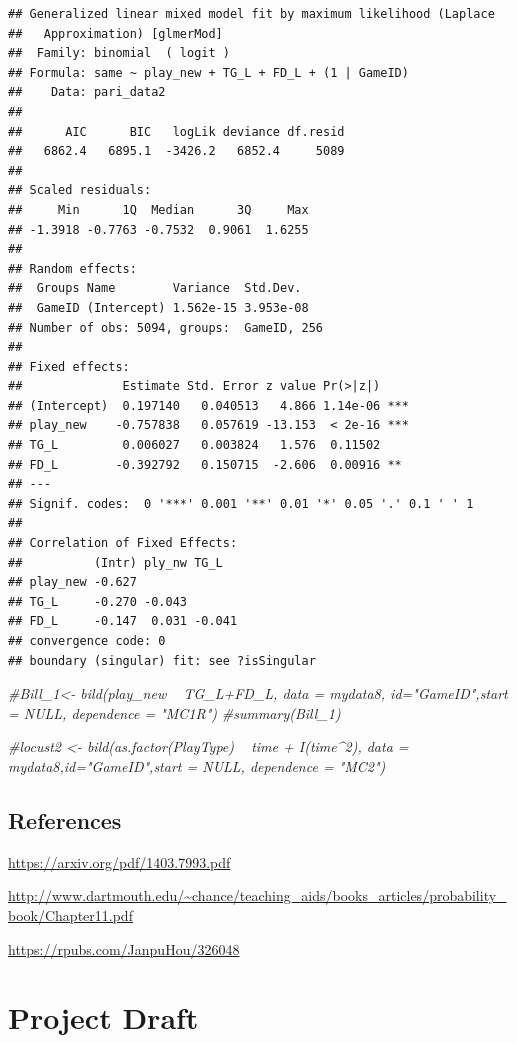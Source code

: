 \documentclass[]{book}
\newenvironment{Shaded}{\begin{snugshade}}{\end{snugshade}}
\newcommand{\CommentTok}[1]{\textcolor[rgb]{0.56,0.35,0.01}{\textit{#1}}}
\begin{document}
\begin{verbatim}
## Generalized linear mixed model fit by maximum likelihood (Laplace
##   Approximation) [glmerMod]
##  Family: binomial  ( logit )
## Formula: same ~ play_new + TG_L + FD_L + (1 | GameID)
##    Data: pari_data2
## 
##      AIC      BIC   logLik deviance df.resid 
##   6862.4   6895.1  -3426.2   6852.4     5089 
## 
## Scaled residuals: 
##     Min      1Q  Median      3Q     Max 
## -1.3918 -0.7763 -0.7532  0.9061  1.6255 
## 
## Random effects:
##  Groups Name        Variance  Std.Dev. 
##  GameID (Intercept) 1.562e-15 3.953e-08
## Number of obs: 5094, groups:  GameID, 256
## 
## Fixed effects:
##              Estimate Std. Error z value Pr(>|z|)    
## (Intercept)  0.197140   0.040513   4.866 1.14e-06 ***
## play_new    -0.757838   0.057619 -13.153  < 2e-16 ***
## TG_L         0.006027   0.003824   1.576  0.11502    
## FD_L        -0.392792   0.150715  -2.606  0.00916 ** 
## ---
## Signif. codes:  0 '***' 0.001 '**' 0.01 '*' 0.05 '.' 0.1 ' ' 1
## 
## Correlation of Fixed Effects:
##          (Intr) ply_nw TG_L  
## play_new -0.627              
## TG_L     -0.270 -0.043       
## FD_L     -0.147  0.031 -0.041
## convergence code: 0
## boundary (singular) fit: see ?isSingular
\end{verbatim}

\begin{Shaded}
\begin{Highlighting}[]
\CommentTok{#Bill_1<- bild(play_new ~ TG_L+FD_L, data = mydata8, id="GameID",start = NULL, dependence = "MC1R")}
\CommentTok{#summary(Bill_1)}

\CommentTok{#locust2 <- bild(as.factor(PlayType) ~ time + I(time^2), data = mydata8,id="GameID",start = NULL, dependence = "MC2")}
\end{Highlighting}
\end{Shaded}

\section{References}\label{references-3}

\url{https://arxiv.org/pdf/1403.7993.pdf}

\url{http://www.dartmouth.edu/~chance/teaching_aids/books_articles/probability_book/Chapter11.pdf}

\url{https://rpubs.com/JanpuHou/326048}

\chapter{Project Draft}\label{project-draft}
\end{document}
